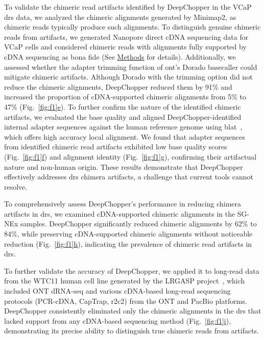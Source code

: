 \documentclass[pdflatex,sn-nature, lineno]{sn-jnl}%
\newcommand{\figref}[2]{Fig.~\hyperref[#1]{\ref*{#1}#2}}
\theoremstyle{thmstyleone}%
\theoremstyle{thmstyletwo}%
\theoremstyle{thmstylethree}%
\begin{document}
To validate the chimeric read artifacts identified by DeepChopper in the VCaP \gls{drs} data, we analyzed the chimeric alignments generated by Minimap2\cite{li2018minimap2}, as chimeric reads typically produce such alignments.
To distinguish genuine chimeric reads from artifacts, we generated Nanopore direct cDNA sequencing data for VCaP cells and considered chimeric reads with alignments fully supported by cDNA sequencing as bona fide (See \hyperref[sec:methods]{Methods} for details).
Additionally, we assessed whether the adapter trimming function of \gls{ont}'s Dorado basecaller could mitigate chimeric artifacts.
Although Dorado with the trimming option did not reduce the chimeric alignments, DeepChopper reduced them by 91\% and increased the proportion of cDNA-supported chimeric alignments from 5\% to 47\% (\figref{fig:f1}{e}).
To further confirm the nature of the identified chimeric artifacts, we evaluated the base quality and aligned DeepChopper-identified internal adapter sequences against the human reference genome using \gls{blat}~\cite{kent2002blat}, which offers high accuracy local alignment.
We found that adapter sequences from identified chimeric read artifacts exhibited low base quality scores (\figref{fig:f1}{f}) and alignment identity (\figref{fig:f1}{g}), confirming their artifactual nature and non-human origin.
These results demonstrate that DeepChopper effectively addresses \gls{drs} chimera artifacts, a challenge that current tools cannot resolve.

To comprehensively assess DeepChopper’s performance in reducing chimera artifacts in \gls{drs}, we examined cDNA-supported chimeric alignments in the SG-NEx samples. 
DeepChopper significantly reduced chimeric alignments by 62\% to 84\%, while preserving cDNA-supported chimeric alignments without noticeable reduction (\figref{fig:f1}{h}), indicating the prevalence of chimeric read artifacts in \gls{drs}. 

To further validate the accuracy of DeepChopper, we applied it to long-read data from the WTC11 human cell line generated by the LRGASP project~\cite{pardo2024systematic}, which included ONT dRNA-seq and various cDNA-based long-read sequencing protocols (PCR-cDNA, CapTrap, \gls{r2c2}) from the ONT and PacBio platforms. DeepChopper consistently eliminated only the chimeric alignments in the \gls{drs} that lacked support from any cDNA-based sequencing method (\figref{fig:f1}{i}), demonstrating its precise ability to distinguish true chimeric reads from artifacts.
\end{document}
